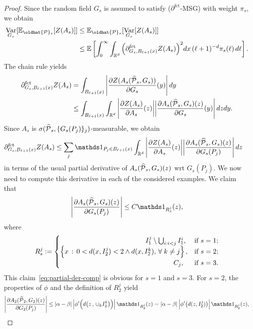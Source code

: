 \documentclass[10pt]{amsart}
\theoremstyle{definition}\newtheorem{defi}[theo]{Definition}\newtheorem{rema}[theo]{Remark}\newtheorem{exam}[theo]{Example}\newtheorem{exem}[theo]{Example}\newtheorem{nota}[theo]{Notation}
\newcommand{\R}{\mathbb R}
\newcommand{\E}{\mathbb{E}}
\newcommand{\expec}[1]{\mathbb{E}\left[#1 \right]}
\newcommand{\Pc}{\mathcal P}
\DeclareMathOperator{\Var}{Var}
\newcommand{\parfct}[1]{\partial_{#1}^{\operatorname{fct}}}
\renewcommand*{\hat}[1]{\mathchoice{\widehat{#1}}{\widehat{#1}}{\oldhat{#1}}{\oldhat{#1}}}\let\oldexists\exists
\renewcommand*{\exists}{\mathrel{\oldexists}}
\let\oldforall\forall
\renewcommand*{\forall}{\mathrel{\oldforall}}
\begin{document}
\begin{proof}
\noindent Since the random field $G_s$ is assumed to satisfy ($\parfct{}$-MSG) with weight $\pi_s$, we obtain
\begin{equation}\label{eq:mixex-0}
\begin{aligned}
\Var_{G_s}[\E_{\hat\Pc_s}[Z(A_s)]]&\le\E_{\hat\Pc_s}[\Var_{G_s}[Z(A_s)]]\\
&\le \expec{\int_0^\infty\int_{\R^d}\Big(\parfct{G_s,B_{\ell+1}(x)}Z(A_s)\Big)^2dx\,(\ell+1)^{-d}\pi_s(\ell)\,d\ell}.
\end{aligned}
\end{equation}
The chain rule yields
\begin{align*}
\parfct{G_s,B_{\ell+1}(x)}Z(A_s)&=\int_{B_{\ell+1}(x)}\left|\frac{\partial Z(A_s(\hat\Pc_s,G_s))}{\partial G_s}(y)\right|dy\\
&\le\int_{B_{\ell+1}(x)}\int_{\R^d}\left|\frac{\partial Z(A_s)}{\partial A_s}(z)\bigg|\bigg|\frac{\partial A_s(\hat\Pc_s,G_s)(z)}{\partial G_s}(y)\right|dzdy.
\end{align*}
Since $A_s$ is $\sigma(\hat\Pc_s,\{G_s(P_j)\}_j)$-measurable, we obtain
\begin{align}\label{eq:mixex-1}
\parfct{G_s,B_{\ell+1}(x)}Z(A_s)&\le\sum_j\mathds1_{P_j\in B_{\ell+1}(x)}\int_{\R^d}\left|\frac{\partial Z(A_s)}{\partial A_s}(z)\bigg|\bigg|\frac{\partial A_s(\hat\Pc_s,G_s)(z)}{\partial G_s(P_j)}\right|dz
\end{align}
in terms of the usual partial derivative of $A_s(\hat\Pc_s,G_s)(z)$ wrt $G_s(P_j)$. We now need to compute this derivative in each of the considered examples. We claim that
\begin{align}\label{eq:partial-der-comp}
\left|\frac{\partial A_s(\hat\Pc_s,G_s)(z)}{\partial G_s(P_j)}\right|\le C\mathds1_{R_s^j}(z),
\end{align}
where
\[
R_s^j:=
\begin{cases}
\mkern225mu I_1^j\setminus \bigcup_{i:i<j}I_1^i,&\text{if }s=1;\\
\left\{x\,:\, 0<d(x,I_2^j)< 2\wedge d(x,I_2^k),\,\forall k\ne j\right\},&\text{if }s=2;\\
\mkern299mu C_j,&\text{if }s=3.
\end{cases}
\]
This claim~\eqref{eq:partial-der-comp} is obvious for $s=1$ and $s=3$. For $s=2$, the properties of $\phi$ and the definition of $R_2^j$ yield
\[
\left|\frac{\partial A_2(\hat\Pc_2,G_2)(z)}{\partial G_2(P_j)}\right|\le |\alpha-\beta|\left|\phi'\Big(d\big(z\,,\,\cup_kI_2^k\big)\Big)\right|\mathds1_{R_2^j}(z)=|\alpha-\beta|\left|\phi'\big(d(z,I_2^j)\big)\right|\mathds1_{R_2^j}(z),
\]
\end{proof}
\end{document}
